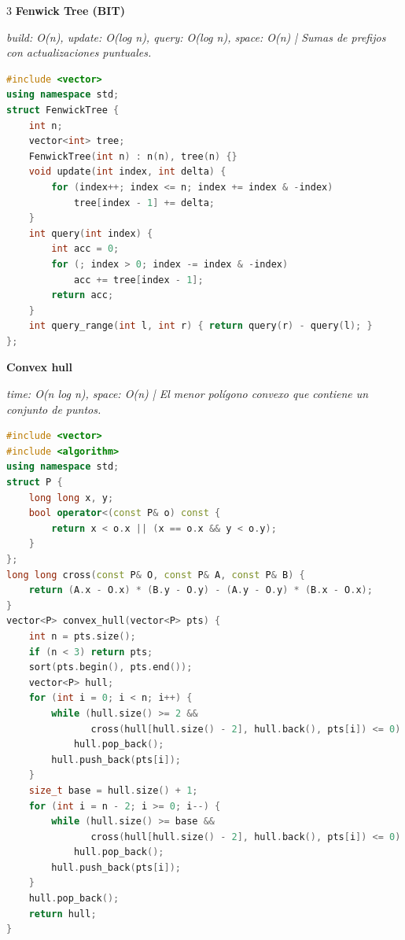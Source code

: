 \documentclass[8pt,a4paper,landscape]{extarticle}
\makeatletter
\newcommand{\csalgo}[1]{%
  \vspace{0.8ex}%
  {\bfseries\small #1}\par
  \vspace{0.4ex}{\color{cs@rule}\hrule height 0.4pt}\vspace{0.5ex}%
}
\newcommand{\csstats}[1]{{\scriptsize\itshape #1\par\vspace{0.3ex}}}
\makeatother
\begin{document}
\begin{multicols}{3}
\csalgo{Fenwick Tree (BIT)}
\csstats{build: O(n), update: O(log n), query: O(log n), space: O(n)  |  Sumas de prefijos con actualizaciones puntuales.}
\begin{lstlisting}[language=C++]
#include <vector>
using namespace std;
struct FenwickTree {
    int n;
    vector<int> tree;
    FenwickTree(int n) : n(n), tree(n) {}
    void update(int index, int delta) {
        for (index++; index <= n; index += index & -index)
            tree[index - 1] += delta;
    }
    int query(int index) {
        int acc = 0;
        for (; index > 0; index -= index & -index)
            acc += tree[index - 1];
        return acc;
    }
    int query_range(int l, int r) { return query(r) - query(l); }
};
\end{lstlisting}

\csalgo{Convex hull}
\csstats{time: O(n log n), space: O(n)  |  El menor polígono convexo que contiene un conjunto de puntos.}
\begin{lstlisting}[language=C++]
#include <vector>
#include <algorithm>
using namespace std;
struct P {
    long long x, y;
    bool operator<(const P& o) const {
        return x < o.x || (x == o.x && y < o.y);
    }
};
long long cross(const P& O, const P& A, const P& B) {
    return (A.x - O.x) * (B.y - O.y) - (A.y - O.y) * (B.x - O.x);
}
vector<P> convex_hull(vector<P> pts) {
    int n = pts.size();
    if (n < 3) return pts;
    sort(pts.begin(), pts.end());
    vector<P> hull;
    for (int i = 0; i < n; i++) {
        while (hull.size() >= 2 &&
               cross(hull[hull.size() - 2], hull.back(), pts[i]) <= 0)
            hull.pop_back();
        hull.push_back(pts[i]);
    }
    size_t base = hull.size() + 1;
    for (int i = n - 2; i >= 0; i--) {
        while (hull.size() >= base &&
               cross(hull[hull.size() - 2], hull.back(), pts[i]) <= 0)
            hull.pop_back();
        hull.push_back(pts[i]);
    }
    hull.pop_back();
    return hull;
}
\end{lstlisting}
\end{multicols}
\end{document}
